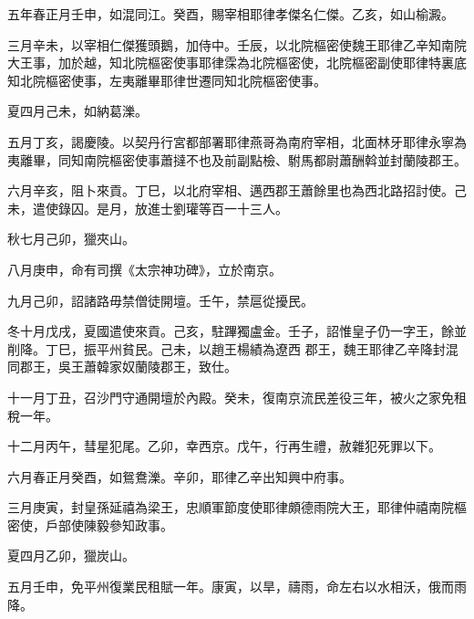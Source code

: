 
\begin{pinyinscope}

 五年春正月壬申，如混同江。癸酉，賜宰相耶律孝傑名仁傑。乙亥，如山榆澱。



 三月辛未，以宰相仁傑獲頭鵝，加侍中。壬辰，以北院樞密使魏王耶律乙辛知南院大王事，加於越，知北院樞密使事耶律霂為北院樞密使，北院樞密副使耶律特裏底知北院樞密使事，左夷離畢耶律世遷同知北院樞密使事。



 夏四月己未，如納葛濼。



 五月丁亥，謁慶陵。以契丹行宮都部署耶律燕哥為南府宰相，北面林牙耶律永寧為夷離畢，同知南院樞密使事蕭撻不也及前副點檢、駙馬都尉蕭酬斡並封蘭陵郡王。



 六月辛亥，阻卜來貢。丁巳，以北府宰相、邁西郡王蕭餘里也為西北路招討使。己未，遣使錄囚。是月，放進士劉瓘等百一十三人。



 秋七月己卯，獵夾山。



 八月庚申，命有司撰《太宗神功碑》，立於南京。



 九月己卯，詔諸路毋禁僧徒開壇。壬午，禁扈從擾民。



 冬十月戊戌，夏國遣使來貢。己亥，駐蹕獨盧金。壬子，詔惟皇子仍一字王，餘並削降。丁巳，振平州貧民。己未，以趙王楊績為遼西
 郡王，魏王耶律乙辛降封混同郡王，吳王蕭韓家奴蘭陵郡王，致仕。



 十一月丁丑，召沙門守通開壇於內殿。癸未，復南京流民差役三年，被火之家免租稅一年。



 十二月丙午，彗星犯尾。乙卯，幸西京。戊午，行再生禮，赦雜犯死罪以下。



 六月春正月癸酉，如鴛鴦濼。辛卯，耶律乙辛出知興中府事。



 三月庚寅，封皇孫延禧為梁王，忠順軍節度使耶律頗德雨院大王，耶律仲禧南院樞密使，戶部使陳毅參知政事。



 夏四月乙卯，獵炭山。



 五月壬申，免平州復業民租賦一年。康寅，以旱，禱雨，命左右以水相沃，俄而雨
 降。




\end{pinyinscope}
